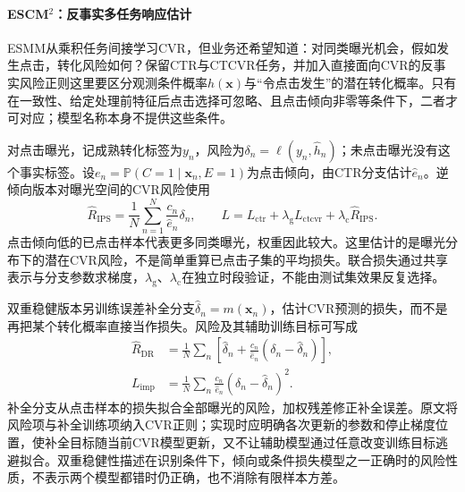 \Needspace{90mm}
\paragraph{ESCM$^2$：反事实多任务响应估计}
\label{sec:rs-advertising-escm2}

ESMM从乘积任务间接学习CVR，但业务还希望知道：对同类曝光机会，假如发生点击，转化风险如何？保留CTR与CTCVR任务，并加入直接面向CVR的反事实风险正则这里要区分观测条件概率$h(\bm{x})$与“令点击发生”的潜在转化概率。只有在一致性、给定处理前特征后点击选择可忽略、且点击倾向非零等条件下，二者才可对应；模型名称本身不提供这些条件。

对点击曝光，记成熟转化标签为$y_n$，风险为$\delta_n=\ell(y_n,\widehat h_n)$；未点击曝光没有这个事实标签。设$e_n=\mathbb{P}(C=1\mid\bm{x}_n,E=1)$为点击倾向，由CTR分支估计$\widehat e_n$。逆倾向版本对曝光空间的CVR风险使用
\begin{equation}
  \widehat R_{\mathrm{IPS}}
  =\frac{1}{N}\sum_{n=1}^{N}
    \frac{c_n}{\widehat e_n}\delta_n,\qquad
  L=L_{\mathrm{ctr}}+\lambda_{\mathrm{g}}L_{\mathrm{ctcvr}}
       +\lambda_{\mathrm{c}}\widehat R_{\mathrm{IPS}}.
  \label{eq:rs-advertising-escm2-ips}
\end{equation}
点击倾向低的已点击样本代表更多同类曝光，权重因此较大。这里估计的是曝光分布下的潜在CVR风险，不是简单重算已点击子集的平均损失。联合损失通过共享表示与分支参数求梯度，$\lambda_{\mathrm{g}}$、$\lambda_{\mathrm{c}}$在独立时段验证，不能由测试集效果反复选择。

双重稳健版本另训练误差补全分支$\widehat\delta_n=m(\bm{x}_n)$，估计CVR预测的损失，而不是再把某个转化概率直接当作损失。风险及其辅助训练目标可写成
\begin{equation}
  \begin{aligned}
    \widehat R_{\mathrm{DR}}
      &=\frac{1}{N}\sum_n
        \left[\widehat\delta_n+
          \frac{c_n}{\widehat e_n}
            (\delta_n-\widehat\delta_n)\right],\\
    L_{\mathrm{imp}}
      &=\frac{1}{N}\sum_n
        \frac{c_n}{\widehat e_n}
        (\delta_n-\widehat\delta_n)^2.
  \end{aligned}
  \label{eq:rs-advertising-escm2-dr}
\end{equation}
补全分支从点击样本的损失拟合全部曝光的风险，加权残差修正补全误差。原文将风险项与补全训练项纳入CVR正则；实现时应明确各次更新的参数和停止梯度位置，使补全目标随当前CVR模型更新，又不让辅助模型通过任意改变训练目标逃避拟合。双重稳健性描述在识别条件下，倾向或条件损失模型之一正确时的风险性质，不表示两个模型都错时仍正确，也不消除有限样本方差。

